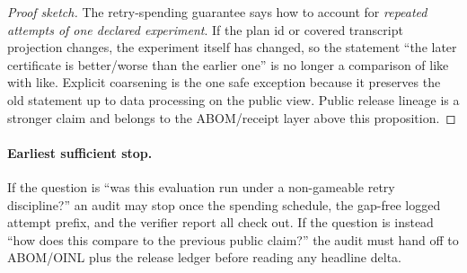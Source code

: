 \documentclass[11pt]{article}
\begin{document}
\begin{proof}[Proof sketch]
The retry-spending guarantee says how to account for \emph{repeated attempts of one declared experiment}.
If the plan id or covered transcript projection changes, the experiment itself has changed, so the statement ``the later certificate is better/worse than the earlier one'' is no longer a comparison of like with like.
Explicit coarsening is the one safe exception because it preserves the old statement up to data processing on the public view.
Public release lineage is a stronger claim and belongs to the ABOM/receipt layer above this proposition.
\end{proof}

\paragraph{Earliest sufficient stop.}
If the question is ``was this evaluation run under a non-gameable retry discipline?'' an audit may stop once the spending schedule, the gap-free logged attempt prefix, and the verifier report all check out.
If the question is instead ``how does this compare to the previous public claim?'' the audit must hand off to ABOM/OINL plus the release ledger before reading any headline delta.\cite{series:abomoinl,series:releaseproperty}
\end{document}
